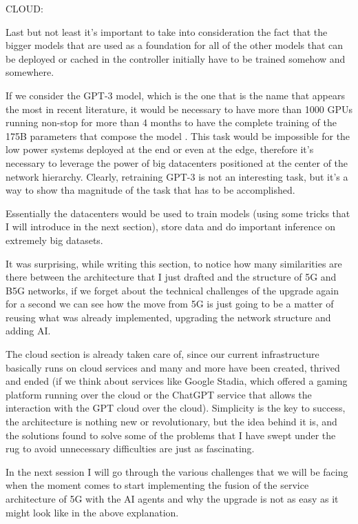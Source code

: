 \bigskip
\noindent
CLOUD:
\label{ssec:cloud}

Last but not least it's important to take into consideration the fact that the bigger models that
are used as a foundation for all of the other models that can be deployed or cached in the
controller initially have to be trained somehow and somewhere.

If we consider the GPT-3 model, which is the one that is the name that appears the most in recent literature, it would be necessary to have more than 1000 GPUs running non-stop for more than
4 months to have the complete training of the 175B parameters that compose the model \cite{gaisnet}. This task would be impossible for the low power systems deployed at the end or even at the edge, therefore
it's necessary to leverage the power of big datacenters positioned at the center of the network
hierarchy.
Clearly, retraining GPT-3 is not an interesting task, but it's a way to show tha magnitude of the
task that has to be accomplished.

Essentially the datacenters would be used to train models (using some tricks that I will introduce
in the next section), store data and do important inference on extremely big datasets.

\bigskip
It was surprising, while writing this section, to notice how many similarities are there between the
architecture that I just drafted and the structure of 5G and B5G networks, if we forget about the
technical challenges of the upgrade again for a second we can see how the move from 5G is just going
to be a matter of reusing what was already implemented, upgrading the network structure and adding
AI.

The cloud section is already taken care of, since our current infrastructure basically runs on cloud
services and many and more have been created, thrived and ended (if we think about services like
Google Stadia, which offered a gaming platform running over the cloud or the ChatGPT service that
allows the interaction with the GPT cloud over the cloud). Simplicity is the key to success, the
architecture is nothing new or revolutionary, but the idea behind it is, and the solutions found to
solve some of the problems that I have swept under the rug to avoid unnecessary difficulties are
just as fascinating.

In the next session I will go through the various challenges that we will be facing when the moment
comes to start implementing the fusion of the service architecture of 5G with the AI agents and why
the upgrade is not as easy as it might look like in the above explanation.
